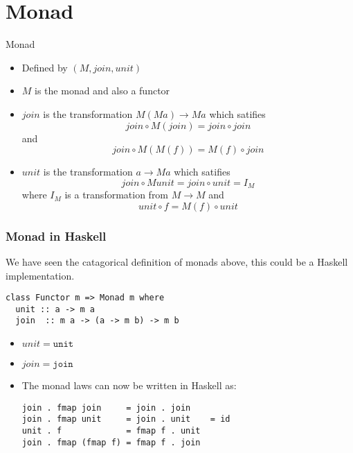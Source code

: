 \documentclass{beamer} %
\begin{document}
\section{Monad}

\begin{frame}{Monad}
  \begin{itemize}
    \item Defined by $(M,\mathit{join},\mathit{unit})$

    \item $M$ is the monad and also a functor

    \item $\mathit{join}$ is the transformation $M (M a) \rightarrow M a$ which satifies
      \[ \mathit{join} \circ M (\mathit{join}) = \mathit{join} \circ \mathit{join}  \]
      and \[ \mathit{join} \circ M(M(f)) = M(f) \circ \mathit{join} \]
    
    \item $\mathit{unit}$ is the transformation $a \rightarrow M a$ which satifies 
      \[ \mathit{join} \circ M \mathit{unit} = \mathit{join} \circ \mathit{unit}  = I_M \] where $I_M$ is a transformation
      from $M \rightarrow M$ and \[ \mathit{unit} \circ f = M(f) \circ \mathit{unit} \]


  \end{itemize}
\end{frame}

\begin{frame}[fragile]\frametitle{Monad in Haskell}
We have seen the catagorical definition of monads above, this could be a
Haskell implementation.
\begin{verbatim}
class Functor m => Monad m where
  unit :: a -> m a
  join  :: m a -> (a -> m b) -> m b
\end{verbatim}
\begin{itemize}
  \item $\mathit{unit} = \texttt{unit}$

  \item $\mathit{join} = \texttt{join}$
  \item The monad laws can now be written in Haskell as:
\begin{verbatim}
join . fmap join     = join . join
join . fmap unit     = join . unit    = id
unit . f             = fmap f . unit
join . fmap (fmap f) = fmap f . join
\end{verbatim}
\end{itemize}
\end{frame}
\end{document}

